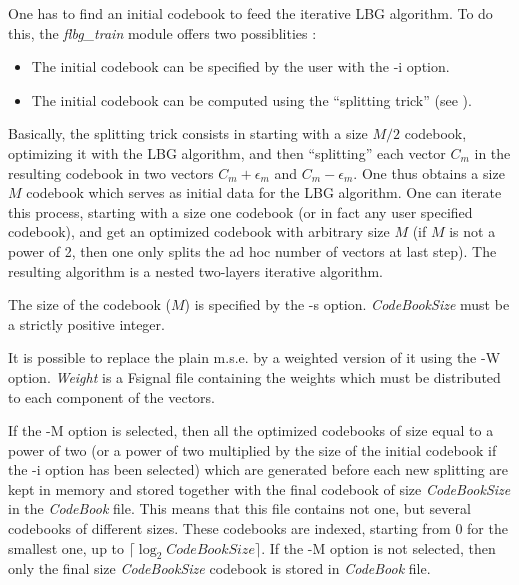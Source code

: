 One has to find an initial codebook to feed the iterative LBG algorithm. 
To do this, the {\em flbg\_train} module offers two possiblities : 
\begin{itemize} 
\item
The initial codebook can be specified by the user with the -i option. 
\item
The initial codebook can be computed using the ``splitting trick'' 
(see \cite{linde.buzo.ea:algorithm}).
\end{itemize}
Basically, the splitting trick consists in starting with a size $M/2$ 
codebook, optimizing it with the LBG algorithm, and then ``splitting'' 
each vector $C_m$ in the resulting codebook in two vectors 
$C_m+\epsilon_m$ and $C_m-\epsilon_m$. One thus obtains a size $M$ 
codebook which serves as initial data for the LBG algorithm. 
One can iterate this process, starting with a size one codebook 
(or in fact any user specified codebook), and get an optimized codebook 
with arbitrary size $M$ (if $M$ is not a power of 2, then one only splits 
the ad hoc number of vectors at last step). The resulting algorithm 
is a nested two-layers iterative algorithm. 

The size of the codebook ($M$) is specified by the -s option. 
{\em CodeBookSize} must be a strictly positive integer. 

It is possible to replace the plain m.s.e. by a weighted version of it 
using the -W option. {\em Weight} is a Fsignal file containing the weights 
which must be distributed to each component of the vectors. 

If the -M option is selected, then all the optimized codebooks of size 
equal to a power of two (or a power of two multiplied by the size of 
the initial codebook if the -i option has been selected) which are generated 
before each new splitting are kept in memory and stored together 
with the final codebook of size {\em CodeBookSize} in the {\em CodeBook} file. 
This means that this file contains not one, but several codebooks 
of different sizes. These codebooks are indexed, starting from 0 
for the smallest one, up to $\lceil \log_2 CodeBookSize \rceil$. 
If the -M option is not selected, then only the final size {\em CodeBookSize} 
codebook is stored in {\em CodeBook} file. 


